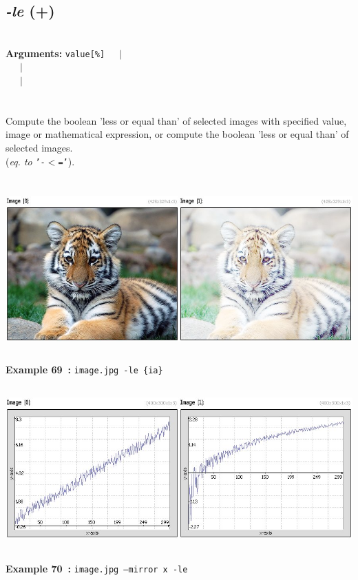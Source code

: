 \documentclass[a4paper,11pt,twoside]{book}
\begin{document}
\subsection{\emph{-le} (+)}\vspace*{-0.5em}
~\\\textbf{Arguments: } 
{\small \texttt{value[\%]}}~~~$|$\\
\hspace*{2.2cm}{\small \texttt{[image]}}~~~$|$\\
~~~$|$\\
\\~\\
Compute the boolean 'less or equal than' of selected images with specified value, image or
mathematical expression, or compute the boolean 'less or equal than' of selected images.
~\\(\emph{eq. to} {\small \texttt{'-$<$='}}).
\begin{center}\includegraphics[keepaspectratio=true,height=7cm,width=\textwidth]{img/gmic_def69.jpg}\\
{\footnotesize \textbf{Example 69~:} \texttt{image.jpg -le \{ia\}}}
\\\includegraphics[keepaspectratio=true,height=7cm,width=\textwidth]{img/gmic_def70.jpg}\\
{\footnotesize \textbf{Example 70~:} \texttt{image.jpg --mirror x -le}}
\end{center}
\end{document}
